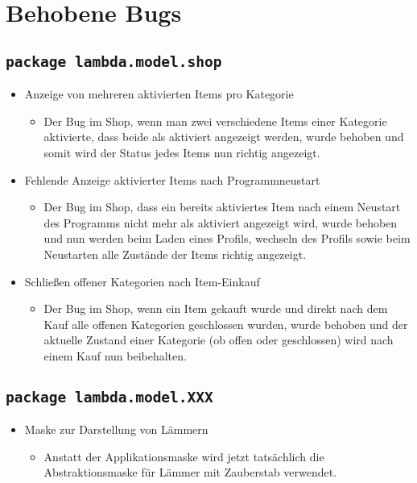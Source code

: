 \section{Behobene Bugs}
\subsection{\texttt{package lambda.model.shop}}
\begin{itemize}
\item Anzeige von mehreren aktivierten Items pro Kategorie
\begin{itemize} 
\item Der Bug im Shop, wenn man zwei verschiedene Items einer Kategorie aktivierte, dass beide als aktiviert angezeigt werden, wurde behoben
	und somit wird der Status jedes Items nun richtig angezeigt.
	\end{itemize}
\end{itemize}

\begin{itemize}
\item Fehlende Anzeige aktivierter Items nach Programmneustart
\begin{itemize} 
\item Der Bug im Shop, dass ein bereits aktiviertes Item nach einem Neustart des Programms nicht mehr als aktiviert angezeigt wird, wurde behoben
	und nun werden beim Laden eines Profils, wechseln des Profils sowie beim Neustarten alle Zustände der Items richtig angezeigt.
	\end{itemize}
\end{itemize}

\begin{itemize}
\item Schließen offener Kategorien nach Item-Einkauf
\begin{itemize} 
\item Der Bug im Shop, wenn ein Item gekauft wurde und direkt nach dem Kauf alle offenen Kategorien geschlossen wurden, wurde behoben und
	der aktuelle Zustand einer Kategorie (ob offen oder geschlossen) wird nach einem Kauf nun beibehalten.
	\end{itemize}
\end{itemize}

\subsection{\texttt{package lambda.model.XXX}}

\begin{itemize}
\item Maske zur Darstellung von Lämmern
\begin{itemize} 
\item Anstatt der Applikationsmaske wird jetzt tatsächlich die Abstraktionsmaske für Lämmer mit Zauberstab verwendet.
	\end{itemize}
\end{itemize}

